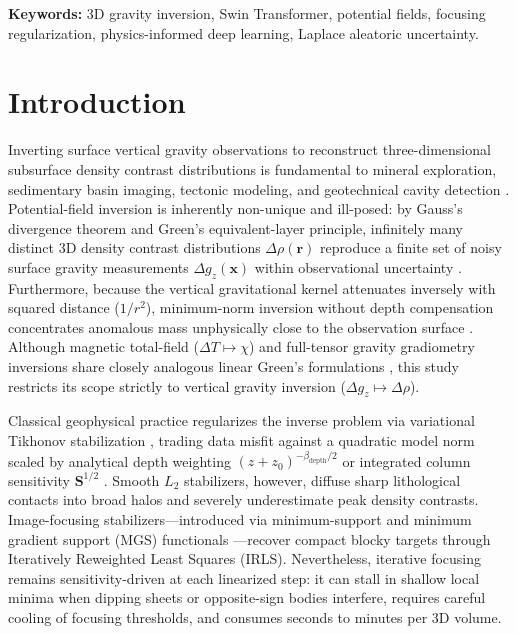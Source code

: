 \documentclass[11pt,a4paper]{article}
\begin{document}
\noindent\textbf{Keywords:} 3D gravity inversion, Swin Transformer, potential fields, focusing regularization, physics-informed deep learning, Laplace aleatoric uncertainty.

\section{Introduction}
\label{sec:intro}

Inverting surface vertical gravity observations to reconstruct three-dimensional subsurface density contrast distributions is fundamental to mineral exploration, sedimentary basin imaging, tectonic modeling, and geotechnical cavity detection \citep{blakely1995,zhdanov2002}. Potential-field inversion is inherently non-unique and ill-posed: by Gauss's divergence theorem and Green's equivalent-layer principle, infinitely many distinct 3D density contrast distributions $\Delta\rho(\mathbf{r})$ reproduce a finite set of noisy surface gravity measurements $\Delta g_z(\mathbf{x})$ within observational uncertainty \citep{parker1994,blakely1995}. Furthermore, because the vertical gravitational kernel attenuates inversely with squared distance ($1/r^2$), minimum-norm inversion without depth compensation concentrates anomalous mass unphysically close to the observation surface \citep{li1998}. Although magnetic total-field ($\Delta T \mapsto \chi$) and full-tensor gravity gradiometry inversions share closely analogous linear Green's formulations \citep{li1996,portniaguine2002}, this study restricts its scope strictly to vertical gravity inversion ($\Delta g_z \mapsto \Delta\rho$).

Classical geophysical practice regularizes the inverse problem via variational Tikhonov stabilization \citep{tikhonov1977}, trading data misfit against a quadratic model norm scaled by analytical depth weighting $(z + z_0)^{-\beta_{\mathrm{depth}}/2}$ \citep{li1998} or integrated column sensitivity $\mathbf{S}^{1/2}$ \citep{zhdanov2002}. Smooth $L_2$ stabilizers, however, diffuse sharp lithological contacts into broad halos and severely underestimate peak density contrasts. Image-focusing stabilizers---introduced via minimum-support \citep{last1983} and minimum gradient support (MGS) functionals \citep{portniaguine1999,zhdanov2002}---recover compact blocky targets through Iteratively Reweighted Least Squares (IRLS). Nevertheless, iterative focusing remains sensitivity-driven at each linearized step: it can stall in shallow local minima when dipping sheets or opposite-sign bodies interfere, requires careful cooling of focusing thresholds, and consumes seconds to minutes per 3D volume.
\end{document}
